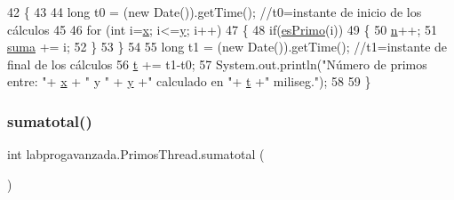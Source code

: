 \begin{DoxyCode}
42                      \{
43         
44         \textcolor{keywordtype}{long} t0 = (\textcolor{keyword}{new} Date()).getTime(); \textcolor{comment}{//t0=instante de inicio de los cálculos}
45         
46         \textcolor{keywordflow}{for} (\textcolor{keywordtype}{int} i=\mbox{\hyperlink{classlabprogavanzada_1_1_primos_thread_a32c2a35f28ba168dd13573c0b2987a35}{x}}; i<=\mbox{\hyperlink{classlabprogavanzada_1_1_primos_thread_ab3a04e01f011379cec6e3448219ccd09}{y}}; i++)
47         \{
48             \textcolor{keywordflow}{if}(\mbox{\hyperlink{classlabprogavanzada_1_1_primos_thread_a25df76b6f0e4824a861b0ca98b623d22}{esPrimo}}(i))
49             \{
50                 \mbox{\hyperlink{classlabprogavanzada_1_1_primos_thread_ae273c3f9736419431b182efcc4e1be3d}{n}}++;
51                 \mbox{\hyperlink{namespacesuma}{suma}} += i;
52             \}
53         \}
54         
55         \textcolor{keywordtype}{long} t1 = (\textcolor{keyword}{new} Date()).getTime(); \textcolor{comment}{//t1=instante de final de los cálculos}
56         \mbox{\hyperlink{classlabprogavanzada_1_1_primos_thread_a23637a099211681b444b018baf22fb1f}{t}} += t1-t0;
57            System.out.println(\textcolor{stringliteral}{"Número de primos entre: "}+ \mbox{\hyperlink{classlabprogavanzada_1_1_primos_thread_a32c2a35f28ba168dd13573c0b2987a35}{x}} + \textcolor{stringliteral}{" y "} + \mbox{\hyperlink{classlabprogavanzada_1_1_primos_thread_ab3a04e01f011379cec6e3448219ccd09}{y}} +\textcolor{stringliteral}{" calculado en "}+ 
      \mbox{\hyperlink{classlabprogavanzada_1_1_primos_thread_a23637a099211681b444b018baf22fb1f}{t}} +\textcolor{stringliteral}{" miliseg."});
58            
59     \}
\end{DoxyCode}
\mbox{\label{classlabprogavanzada_1_1_primos_thread_a9a33039e78956e9b9f6d1ec08aa5b870}} 
\subsubsection{\texorpdfstring{sumatotal()}{sumatotal()}}
{\footnotesize\ttfamily int labprogavanzada.\+Primos\+Thread.\+sumatotal (\begin{DoxyParamCaption}{ }\end{DoxyParamCaption})\hspace{0.3cm}{\ttfamily [inline]}}


